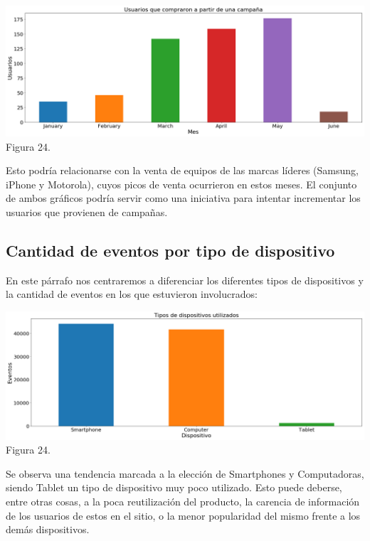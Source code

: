 \documentclass[a4paper ,12pt]{article}
\begin{document}
\begin{center}
	\includegraphics[width=1.1\linewidth]{output_75_1}
	Figura 24.
	
\end{center}

Esto podría relacionarse con la venta de equipos de las marcas líderes (Samsung, iPhone y Motorola), cuyos picos de venta ocurrieron en estos meses. 
El conjunto de ambos gráficos podría servir como una iniciativa para intentar incrementar los usuarios que provienen de campañas.\\
\newpage

\subsection{Cantidad de eventos por tipo de dispositivo}
En este párrafo nos centraremos a diferenciar los diferentes tipos de dispositivos y la cantidad de eventos en los que estuvieron involucrados:\\

\begin{center}
	\includegraphics[width=1.1\linewidth]{output_78_1}
	Figura 24.
	
\end{center}


Se observa una tendencia marcada a la elección de Smartphones y Computadoras, siendo Tablet un tipo de dispositivo muy poco utilizado.
Esto puede deberse, entre otras cosas, a la poca reutilización del producto, la carencia de información de los usuarios de estos en el sitio, o la menor popularidad del mismo frente a los demás dispositivos.
\\
\end{document}
